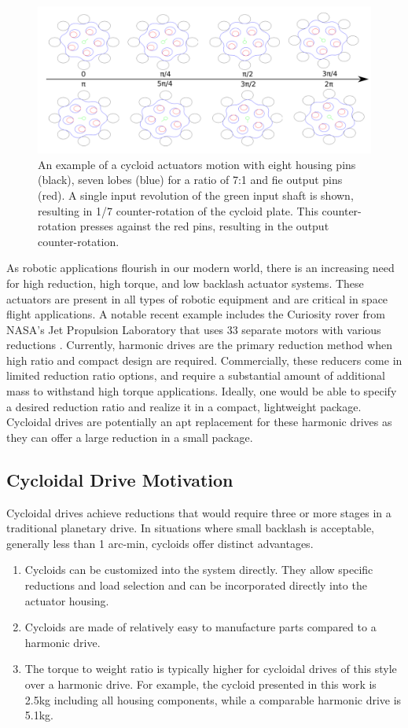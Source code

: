 \begin{figure}[t]
	\centering
	\includegraphics[width=0.8\linewidth]{images/single_motion}
	\caption{An example of a cycloid actuators motion with eight housing pins (black), seven lobes (blue) for a ratio of 7:1 and fie output pins (red). A single input revolution of the green input shaft is shown, resulting in 1/7 counter-rotation of the cycloid plate. This counter-rotation presses against the red pins, resulting in the output counter-rotation. 
	}
	\label{cycloid_motion}
\end{figure}

As robotic applications flourish in our modern world, there is an increasing need for high reduction, high torque, and low backlash actuator systems.
These actuators are present in all types of robotic equipment and are critical in space flight applications.
A notable recent example includes the Curiosity rover from NASA's Jet Propulsion Laboratory that uses 33 separate motors with various reductions \cite{curiosity}.
Currently, harmonic drives are the primary reduction method when high ratio and compact design are required.
Commercially, these reducers come in limited reduction ratio options, and require a substantial amount of additional mass to withstand high torque applications.
Ideally, one would be able to specify a desired reduction ratio and realize it in a compact, lightweight package. 
Cycloidal drives are potentially an apt replacement for these harmonic drives as they can offer a large reduction in a small package.


\subsection{Cycloidal Drive Motivation}

Cycloidal drives achieve reductions that would require three or more stages in a traditional planetary drive. 
In situations where small backlash is acceptable, generally less than 1 arc-min, cycloids offer distinct advantages.

\begin{enumerate}
\item
Cycloids can be customized into the system directly. They allow specific reductions and load selection and can be incorporated directly into the actuator housing.
\item
Cycloids are made of relatively easy to manufacture parts compared to a harmonic drive.
\item
The torque to weight ratio is typically higher for cycloidal drives of this style over a harmonic drive.
For example, the cycloid presented in this work is 2.5kg including all housing components, while a comparable harmonic drive is 5.1kg.
\end{enumerate}

